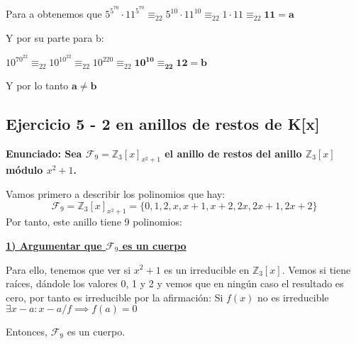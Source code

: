 \documentclass[11pt, a4paper, titlepage]{article}
\providecommand{\ent}{\mathbb{Z}}
\begin{document}
Para a obtenemos que $5^{5^{70}}\cdot11^{5^{70}}\equiv_{22}5^{10} \cdot 11^{10} \equiv_{22} 1 \cdot 11\equiv_{22}\mathbf{11 = a}$

Y por su parte para b:

$10^{70^{22}} \equiv_{22} 10^{10^{22}}\equiv_{22} 10^{220} \equiv_{22}\mathbf{10^{10}\equiv_{22}12=b}$

Y por lo tanto $\mathbf{a \neq b}$



\subsection{\LARGE{Ejercicio 5 - 2 en anillos de restos de K[x]}} 

\textbf{Enunciado: Sea $\mathcal{F}_9 = \ent_3[x]_{ x^2 +1}$ el anillo de restos del anillo $\ent_3[x]$ módulo $x^2 +1$.}


Vamos primero a describir los polinomios que hay:
\[
\mathcal{F}_9 =\ent_3[x]_{x^2+1}= \{0,1,2,x,x+1,x+2,2x,2x+1,2x+2\}
\]
Por tanto, este anillo tiene 9 polinomios:

\underline{\textbf{1) Argumentar que $\mathcal{F}_9$ es un cuerpo}}

Para ello, tenemos que ver si $x^2+1$ es un irreducible en $\ent_3[x]$. Vemos si tiene raíces, dándole los valores 0, 1 y 2 y vemos que en ningún caso el resultado es cero, por tanto es irreducible por la afirmación: Si $f(x)$ no es irreducible $\exists x-a : x-a/f \implies f(a) = 0$

Entonces, $\mathcal{F}_9$ es un cuerpo.
\end{document}
